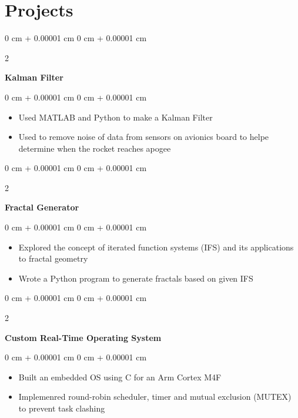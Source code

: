 \documentclass[10pt, letterpaper]{article}
\newenvironment{onecolentry}{
    \begin{adjustwidth}{
        0 cm + 0.00001 cm
    }{
        0 cm + 0.00001 cm
    }
}{
    \end{adjustwidth}
} %
\newenvironment{twocolentry}[2][]{
    \onecolentry
    \def\secondColumn{#2}
    \setcolumnwidth{\fill, 4.5 cm}
    \begin{paracol}{2}
}{
    \switchcolumn \raggedleft \secondColumn
    \end{paracol}
    \endonecolentry
} %
\begin{document}
    \section{Projects}

        \begin{twocolentry}{}
            \textbf{Kalman Filter}
        \end{twocolentry}

        \vspace{0.10 cm}
        \begin{onecolentry}
            \begin{itemize}
                \item Used MATLAB and Python to make a Kalman Filter
                \item Used to remove noise of data from sensors on avionics board to helpe determine when the rocket reaches apogee
            \end{itemize}
        \end{onecolentry}


        \vspace{0.2 cm}

        \begin{twocolentry}{}
            \textbf{Fractal Generator}
        \end{twocolentry}

        \vspace{0.10 cm}
        \begin{onecolentry}
            \begin{itemize}
                \item Explored the concept of iterated function systems (IFS) and its applications to fractal geometry 
                \item Wrote a Python program to generate fractals based on given IFS
            \end{itemize}
        \end{onecolentry}


        \vspace{0.2 cm}

        \begin{twocolentry}{}
            \textbf{Custom Real-Time Operating System}
        \end{twocolentry}

        \vspace{0.10 cm}
        \begin{onecolentry}
            \begin{itemize}
                \item Built an embedded OS using C for an Arm Cortex M4F 
                \item Implemenred round-robin scheduler, timer and mutual exclusion (MUTEX) to prevent task clashing
            \end{itemize}
        \end{onecolentry}
\end{document}
